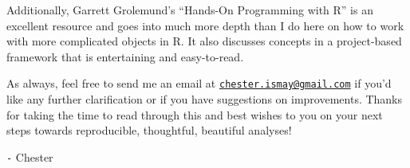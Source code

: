 \documentclass[]{tufte-book}
\begin{document}
Additionally, Garrett Grolemund's ``Hands-On Programming with R'' \citep{handson2014} is an excellent resource and goes into much more depth than I do here on how to work with more complicated objects in R. It also discusses concepts in a project-based framework that is entertaining and easy-to-read.

As always, feel free to send me an email at \href{mailto:chester.ismay@gmail.com}{\nolinkurl{chester.ismay@gmail.com}} if you'd like any further clarification or if you have suggestions on improvements. Thanks for taking the time to read through this and best wishes to you on your next steps towards reproducible, thoughtful, beautiful analyses!

\texttt{-} Chester

\renewcommand{\bibname}{References}

% 
% 
\end{document}
